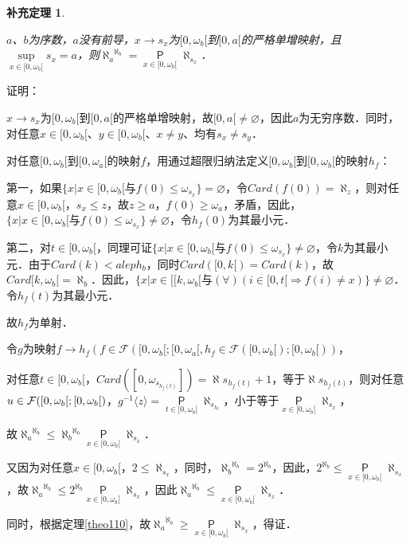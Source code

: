 \documentclass[12pt, a4paper, oneside]{book}
\newtheorem{cor}{补充定理}
\begin{document}
			\begin{cor}\label{cor383}
				\hfill\par
				$a$、$b$为序数，$a$没有前导，$x\to s_x$为$[0, \omega_b[$到$[0, a[$的严格单增映射，且$\mathop{sup}\limits_{x\in [0, \omega_b[}s_x=a$，则${\aleph_a}^{\aleph_b}=\mathop{\mathsf{P}}\limits_{x\in [0, \omega_b[}\aleph_{s_x}$．
			\end{cor}
			证明：
			\par
			$x\to s_x$为$[0, \omega_b[$到$[0, a[$的严格单增映射，故$[0, a[\neq \varnothing$，因此$a$为无穷序数．同时，对任意$x\in [0, \omega_b[$、$y\in [0, \omega_b[$、$x\neq y$、均有$s_x\neq s_y$．
			\par
			对任意$[0, \omega_b[$到$[0, \omega_a[$的映射$f$，用通过超限归纳法定义$[0, \omega_b[$到$[0, \omega_b[$的映射$h_f$：
			\par
			第一，如果$\{x|x\in [0, \omega_b[\text{与}f(0)\leq \omega_{s_x}\}=\varnothing$，令$Card(f(0))=\aleph_z$，则对任意$x\in [0, \omega_b[$，$s_x\leq z$，故$z\geq a$，$f(0)\geq \omega_a$，矛盾，因此，$\{x|x\in [0, \omega_b[\text{与}f(0)\leq \omega_{s_x}\}\neq\varnothing$，令$h_f(0)$为其最小元．
			\par
			第二，对$t\in [0, \omega_b[$，同理可证$\{x|x\in [0, \omega_b[\text{与}f(0)\leq \omega_{s_x}\}\neq\varnothing$，令$k$为其最小元．由于$Card(k)<aleph_b$，同时$Card([0, k[)=Card(k)$，故$Card[k, \omega_b[=\aleph_b$．因此，$\{x|x\in [[k, \omega_b[\text{与}(\forall)(i\in [0, t[\Rightarrow f(i)\neq x)\}\neq \varnothing$．令$h_f(t)$为其最小元．
			\par
			故$h_f$为单射．
			\par
			令$g$为映射$f\to h_f(f\in \mathcal{F}([0, \omega_b[; [0, \omega_a[, h_f\in \mathcal{F}([0, \omega_b[); [0, \omega_b[))$，
			\par
			对任意$t\in [0, \omega_b[$，$Card([0, \omega_{s_{h_f(t)}}])=\aleph{s_{h_f(t)}}+1$，等于$\aleph{s_{h_f(t)}}$，则对任意$u\in\\\mathcal{F}([0, \omega_b[; [0, \omega_b[)$，$g^{-1}\langle z\rangle=\mathop{\mathsf{P}}\limits_{t\in [0, \omega_b[}\aleph_{s_{h_t}}$，小于等于$\mathop{\mathsf{P}}\limits_{x\in [0, \omega_b[}\aleph_{s_x}$，
			\par			
			故${\aleph_a}^{\aleph_b}\leq {\aleph_b}^{\aleph_b}\mathop{\mathsf{P}}\limits_{x\in [0, \omega_b[}\aleph_{s_x}$．
			\par
			又因为对任意$x\in [0, \omega_b[$，$2\leq \aleph_{s_x}$，同时，${\aleph_b}^{\aleph_b}=2^{\aleph_b}$，因此，$2^{\aleph_b}\leq\mathop{\mathsf{P}}\limits_{x\in [0, \omega_b[}\aleph_{s_x}$，故${\aleph_a}^{\aleph_b}\leq 2^{\aleph_b}\mathop{\mathsf{P}}\limits_{x\in [0, \omega_b[}\aleph_{s_x}$，因此${\aleph_a}^{\aleph_b}\leq \mathop{\mathsf{P}}\limits_{x\in [0, \omega_b[}\aleph_{s_x}$．
			\par
			同时，根据定理\ref{theo110}，故${\aleph_a}^{\aleph_b}\geq\mathop{\mathsf{P}}\limits_{x\in [0, \omega_b[}\aleph_{s_x}$，得证．
			
\end{document}
